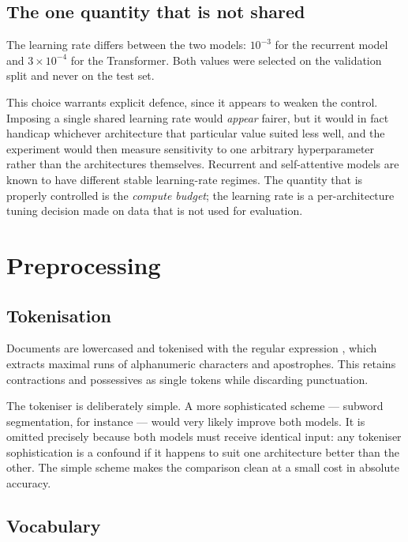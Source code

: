 \subsection{The one quantity that is not shared}

The learning rate differs between the two models: $10^{-3}$ for the recurrent model and
$3\times10^{-4}$ for the Transformer. Both values were selected on the validation split and never
on the test set.

This choice warrants explicit defence, since it appears to weaken the control. Imposing a single
shared learning rate would \emph{appear} fairer, but it would in fact handicap whichever
architecture that particular value suited less well, and the experiment would then measure
sensitivity to one arbitrary hyperparameter rather than the architectures themselves. Recurrent
and self-attentive models are known to have different stable learning-rate regimes. The quantity
that is properly controlled is the \emph{compute budget}; the learning rate is a per-architecture
tuning decision made on data that is not used for evaluation.

\section{Preprocessing}
\label{sec:tokenisation}

\subsection{Tokenisation}

Documents are lowercased and tokenised with the regular expression
\code{[a-z0-9']+}, which extracts maximal runs of alphanumeric characters and apostrophes. This
retains contractions and possessives as single tokens while discarding punctuation.

The tokeniser is deliberately simple. A more sophisticated scheme --- subword segmentation, for
instance --- would very likely improve both models. It is omitted precisely because both models
must receive identical input: any tokeniser sophistication is a confound if it happens to suit one
architecture better than the other. The simple scheme makes the comparison clean at a small cost in
absolute accuracy.

\subsection{Vocabulary}

